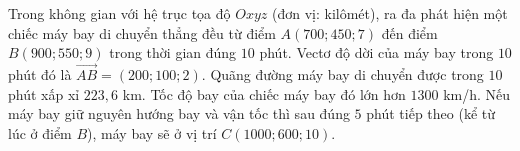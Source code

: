 \begin{ex}
Trong không gian với hệ trục tọa độ $Oxyz$ (đơn vị: kilômét), ra đa phát hiện một chiếc máy bay di chuyển thẳng đều từ điểm $A(700;450;7)$ đến điểm $B(900;550;9)$ trong thời gian đúng $10$ phút.
\choiceTF
{\True Vectơ độ dời của máy bay trong $10$ phút đó là $\overrightarrow{AB}=(200;100;2)$.}
{\True Quãng đường máy bay di chuyển được trong $10$ phút xấp xỉ $223{,}6$ km.}
{\True Tốc độ bay của chiếc máy bay đó lớn hơn $1300$ km/h.}
{\True Nếu máy bay giữ nguyên hướng bay và vận tốc thì sau đúng $5$ phút tiếp theo (kể từ lúc ở điểm $B$), máy bay sẽ ở vị trí $C(1000;600;10)$.}
\end{ex}
